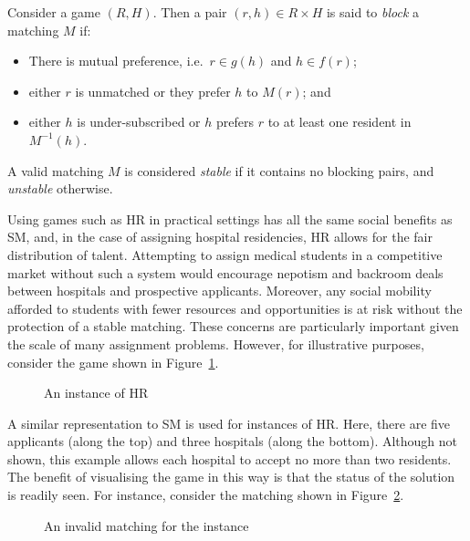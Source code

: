 \begin{definition}\label{def:hr_blocking}
    Consider a game \((R, H)\). Then a pair \((r, h) \in R \times H\) is said to
    \emph{block} a matching \(M\) if:

    \begin{itemize}
        \item There is mutual preference, i.e.\ \(r \in g(h)\) and \(h \in
            f(r)\);
        \item either \(r\) is unmatched or they prefer \(h\) to \(M(r)\); and
        \item either \(h\) is under-subscribed or \(h\) prefers \(r\) to at
            least one resident in \(M^{-1}(h)\).
    \end{itemize}

    A valid matching \(M\) is considered \emph{stable} if it contains no
    blocking pairs, and \emph{unstable} otherwise.
\end{definition}

Using games such as HR in practical settings has all the same social benefits as
SM, and, in the case of assigning hospital residencies, HR allows for the fair
distribution of talent. Attempting to assign medical students in a competitive
market without such a system would encourage nepotism and backroom deals between
hospitals and prospective applicants. Moreover, any social mobility afforded to
students with fewer resources and opportunities is at risk without the
protection of a stable matching. These concerns are particularly important given
the scale of many assignment problems. However, for illustrative purposes,
consider the game shown in Figure~\ref{fig:hr_matching}.

\begin{figure}[htbp]
    \centering
    
    \caption{An instance of HR}\label{fig:hr_matching}
\end{figure}

A similar representation to SM is used for instances of HR. Here, there are five
applicants (along the top) and three hospitals (along the bottom). Although not
shown, this example allows each hospital to accept no more than two residents.
The benefit of visualising the game in this way is that the status of the
solution is readily seen. For instance, consider the matching shown in
Figure~\ref{fig:hr_invalid}.

\begin{figure}[htbp]
    \centering
    
    \caption{An invalid matching for the instance}\label{fig:hr_invalid}
\end{figure}

